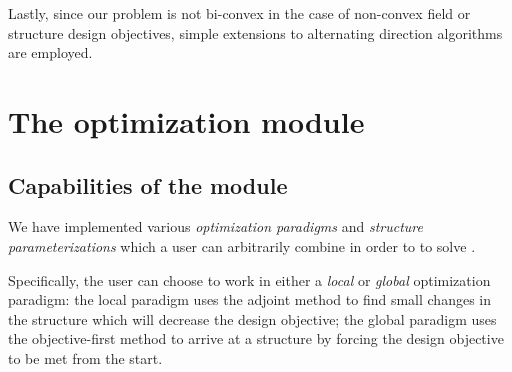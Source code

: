 \documentclass{book}
\begin{document}
Lastly, since our problem is not bi-convex 
    in the case of non-convex field or structure design objectives,
    simple extensions to alternating direction algorithms are employed.

% 

\chapter{The optimization module}

\section{Capabilities of the module}\label{capabilities of our software}
We have implemented various 
    \emph{optimization paradigms} and \emph{structure parameterizations}
    which a user can arbitrarily combine in order to 
    to solve .

Specifically, the user can choose to work in either
    a \emph{local} or \emph{global} optimization paradigm:
    \BI the local paradigm uses the adjoint method
            to find small changes in the structure which
            will decrease the design objective;
    \I  the global paradigm uses the objective-first method
            to arrive at a structure by forcing
            the design objective to be met from the start. \EI
\end{document}
